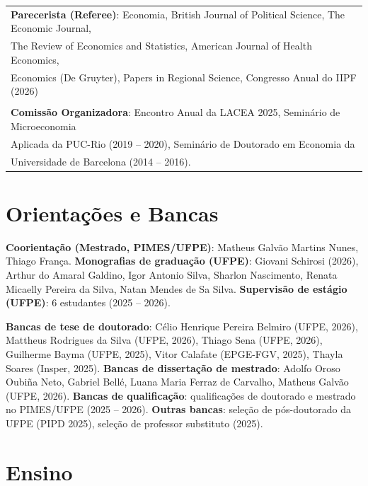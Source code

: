 \documentclass[a4paper,9pt]{article}
\begin{document}
\begin{flushleft}
\begin{tabular}{l}
\textbf{Parecerista (Referee)}: Economia, British Journal of Political Science, The Economic Journal, \\
The Review of Economics and Statistics, American Journal of Health Economics, \\
Economics (De Gruyter), Papers in Regional Science, Congresso Anual do IIPF (2026) \\
\\
\textbf{Comissão Organizadora}: Encontro Anual da LACEA 2025, Seminário de Microeconomia \\
Aplicada da PUC-Rio (2019 -- 2020), Seminário de Doutorado em Economia da \\
Universidade de Barcelona (2014 -- 2016). \\
\end{tabular}
\end{flushleft}

\section{Orientações e Bancas}

\noindent \textbf{Coorientação (Mestrado, PIMES/UFPE)}: Matheus Galvão Martins Nunes, Thiago França. \textbf{Monografias de graduação (UFPE)}: Giovani Schirosi (2026), Arthur do Amaral Galdino, Igor Antonio Silva, Sharlon Nascimento, Renata Micaelly Pereira da Silva, Natan Mendes de Sa Silva. \textbf{Supervisão de estágio (UFPE)}: 6 estudantes (2025 -- 2026).

\vspace{1mm}

\noindent \textbf{Bancas de tese de doutorado}: Célio Henrique Pereira Belmiro (UFPE, 2026), Mattheus Rodrigues da Silva (UFPE, 2026), Thiago Sena (UFPE, 2026), Guilherme Bayma (UFPE, 2025), Vitor Calafate (EPGE-FGV, 2025), Thayla Soares (Insper, 2025). \textbf{Bancas de dissertação de mestrado}: Adolfo Oroso Oubiña Neto, Gabriel Bellé, Luana Maria Ferraz de Carvalho, Matheus Galvão (UFPE, 2026). \textbf{Bancas de qualificação}: qualificações de doutorado e mestrado no PIMES/UFPE (2025 -- 2026). \textbf{Outras bancas}: seleção de pós-doutorado da UFPE (PIPD 2025), seleção de professor substituto (2025).

\section{Ensino}
\end{document}

